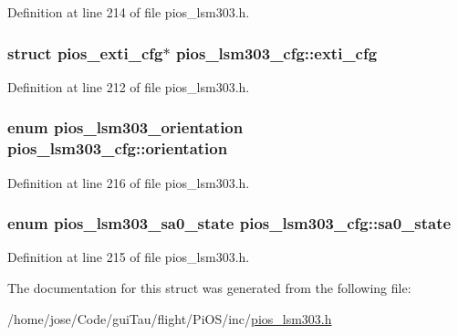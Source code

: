 Definition at line 214 of file pios\-\_\-lsm303.\-h.

\hypertarget{structpios__lsm303__cfg_a90c0ca7937453279f276d8adc5b7e82c}{
\subsubsection[{exti\-\_\-cfg}]{\setlength{\rightskip}{0pt plus 5cm}struct {\bf pios\-\_\-exti\-\_\-cfg}$\ast$ pios\-\_\-lsm303\-\_\-cfg\-::exti\-\_\-cfg}}\label{structpios__lsm303__cfg_a90c0ca7937453279f276d8adc5b7e82c}


Definition at line 212 of file pios\-\_\-lsm303.\-h.

\hypertarget{structpios__lsm303__cfg_a53a64d5c1d513bda3033f35b41a5afcc}{
\subsubsection[{orientation}]{\setlength{\rightskip}{0pt plus 5cm}enum {\bf pios\-\_\-lsm303\-\_\-orientation} pios\-\_\-lsm303\-\_\-cfg\-::orientation}}\label{structpios__lsm303__cfg_a53a64d5c1d513bda3033f35b41a5afcc}


Definition at line 216 of file pios\-\_\-lsm303.\-h.

\hypertarget{structpios__lsm303__cfg_a14bcbef91027a231f863b4629c9cdc74}{
\subsubsection[{sa0\-\_\-state}]{\setlength{\rightskip}{0pt plus 5cm}enum {\bf pios\-\_\-lsm303\-\_\-sa0\-\_\-state} pios\-\_\-lsm303\-\_\-cfg\-::sa0\-\_\-state}}\label{structpios__lsm303__cfg_a14bcbef91027a231f863b4629c9cdc74}


Definition at line 215 of file pios\-\_\-lsm303.\-h.



The documentation for this struct was generated from the following file\-:\begin{DoxyCompactItemize}
\item 
/home/jose/\-Code/gui\-Tau/flight/\-Pi\-O\-S/inc/\hyperlink{pios__lsm303_8h}{pios\-\_\-lsm303.\-h}\end{DoxyCompactItemize}

